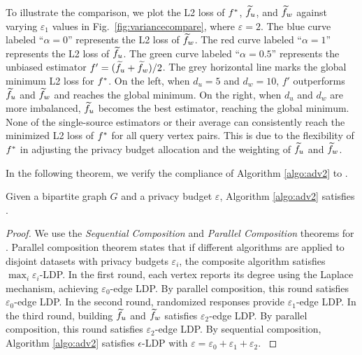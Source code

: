 To illustrate the comparison, we plot the L2 loss of $f^*$, $\widetilde{f}_u$, and $\widetilde{f}_w$ against varying $\varepsilon_1$ values in Fig.~\ref{fig:variancecompare}, where $\varepsilon=2$. 
The blue curve labeled ``$\alpha = 0$'' represents the L2 loss of $\widetilde{f}_w$. 
The red curve labeled ``$\alpha = 1$'' represents the L2 loss of $\widetilde{f}_u$. 
The green curve labeled ``$\alpha = 0.5$''  represents the unbiased estimator $f' = (\widetilde{f}_u + \widetilde{f}_w)/2$. 
The grey horizontal line marks the global minimum L2 loss for $f^*$. 
On the left, when $d_u = 5$ and $d_w = 10$, $f'$ outperforms $\widetilde{f}_u$ and $\widetilde{f}_w$ and reaches the global minimum. 
On the right, when $d_u$ and $d_w$ are more imbalanced, $\widetilde{f}_u$ becomes the best estimator, reaching the global minimum. 
None of the single-source estimators or their average can consistently reach the minimized L2 loss of $f^*$ for all query vertex pairs. 
This is due to the flexibility of $f^*$ in adjusting the privacy budget allocation and the weighting of $\widetilde{f}_u$ and $\widetilde{f}_w$.


In the following theorem, we verify the compliance of Algorithm \ref{algo:adv2} to \epldp. 
\begin{theorem} 
{
Given a bipartite graph $G$ and a privacy budget $\varepsilon$, Algorithm \ref{algo:adv2} satisfies \epldp. }
\end{theorem} 
\begin{proof}
{
We use the {\em Sequential Composition} and {\em Parallel Composition} theorems for \epldp \cite{jiang2021applications}. 
Parallel composition theorem states that if different \epldp algorithms are applied to disjoint datasets with privacy budgets \(\varepsilon_i\), the composite algorithm satisfies \(\max_i \varepsilon_i\)-LDP. 
In the first round, each vertex reports its degree using the Laplace mechanism, achieving \(\varepsilon_0\)-edge LDP. 
By parallel composition, this round satisfies \(\varepsilon_0\)-edge LDP. 
In the second round, randomized responses provide \(\varepsilon_1\)-edge LDP. 
In the third round, building \(\widetilde{f}_u\) and \(\widetilde{f}_w\) satisfies \(\varepsilon_2\)-edge LDP. 
By parallel composition, this round satisfies \(\varepsilon_2\)-edge LDP. 
By sequential composition, Algorithm \ref{algo:adv2} satisfies \(\epsilon\)-LDP with \(\varepsilon = \varepsilon_0 + \varepsilon_1 + \varepsilon_2\). 
}
\end{proof}


